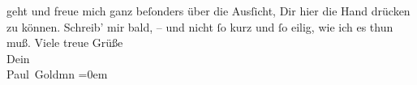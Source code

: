 \begin{ledgroupsized}[t]{13cm}
               geht und freue mich ganz beſonders über die Ausſicht, Dir \label{K_L03224-2v}\label{K_L03224-2h}{ }hier die Hand drücken zu
               können.\pend
           \pstart
           Schreib’ mir bald, – und nicht ſo kurz und ſo 
               eilig, wie ich es thun muß.\pend
           \pstart
           Viele treue Grüße {\\[\baselineskip]}Dein {\\[\baselineskip]}\spacefill\mbox{Paul Goldmn}\pend
           \leftskip=0em{}
         
         \endnumbering{}\end{ledgroupsized}  \newcommand{\dateiname}{L03224}\newcommand{\titel}{Paul Goldmann an Arthur Schnitzler, 16. 9. [1902]}\newcommand{\editorInnen}{Martin Anton Müller und Laura Untner}
      